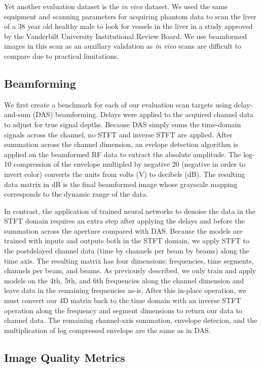 Yet another evaluation dataset is the \textit{in vivo} dataset. We used the same equipment and scanning parameters for acquiring phantom data to scan the liver of a 38 year old healthy male to look for vessels in the liver in a study approved by the Vanderbilt University Institutional Review Board. We use beamformed images in this scan as an auxillary validation as \textit{in vivo} scans are difficult to compare due to practical limitations.

\subsection{Beamforming}

We first create a benchmark for each of our evaluation scan targets using delay-and-sum (DAS) beamforming. Delays were applied to the acquired channel data to adjust for true signal depths. Because DAS simply sums the time-domain signals across the channel, no STFT and inverse STFT are applied. After summation across the channel dimension, an evelope detection algorithm is applied on the beamformed RF data to extract the absolute amplitude. The log-10 compression of the envelope multipled by negative 20 (negative in order to invert color) converts the units from volts (V) to decibels (dB). The resulting data matrix in dB is the final beamformed image whose grayscale mapping corresponds to the dynamic range of the data.

In contrast, the application of trained neural networks to denoise the data in the STFT domain requires an extra step after applying the delays and before the summation across the aperture compared with DAS. Because the models are trained with inputs and outputs both in the STFT domain, we apply STFT to the postdelayed channel data (time by channels per beam by beams) along the time axis. The resulting matrix has four dimensions: frequencies, time segments, channels per beam, and beams. As previously described, we only train and apply models on the 4th, 5th, and 6th frequencies along the channel dimension and leave data in the remaining frequencies as-is. After this in-place operation, we must convert our 4D matrix back to the time domain with an inverse STFT operation along the frequency and segment dimensions to return our data to channel data. The remaining channel-axis summation, envelope detecion, and the multiplication of log compressed envelope are the same as in DAS.


\subsection{Image Quality Metrics}

